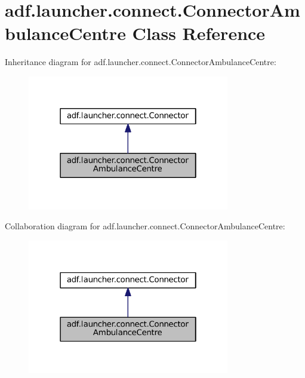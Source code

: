\hypertarget{classadf_1_1launcher_1_1connect_1_1ConnectorAmbulanceCentre}{}\section{adf.\+launcher.\+connect.\+Connector\+Ambulance\+Centre Class Reference}
\label{classadf_1_1launcher_1_1connect_1_1ConnectorAmbulanceCentre}


Inheritance diagram for adf.\+launcher.\+connect.\+Connector\+Ambulance\+Centre\+:
\nopagebreak
\begin{figure}[H]
\begin{center}
\leavevmode
\includegraphics[width=250pt]{classadf_1_1launcher_1_1connect_1_1ConnectorAmbulanceCentre__inherit__graph}
\end{center}
\end{figure}


Collaboration diagram for adf.\+launcher.\+connect.\+Connector\+Ambulance\+Centre\+:
\nopagebreak
\begin{figure}[H]
\begin{center}
\leavevmode
\includegraphics[width=250pt]{classadf_1_1launcher_1_1connect_1_1ConnectorAmbulanceCentre__coll__graph}
\end{center}
\end{figure}
